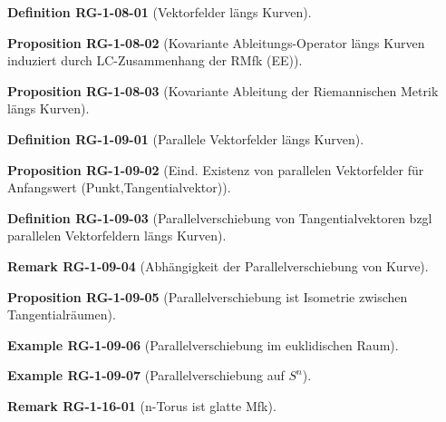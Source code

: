 \documentclass[10pt, letterpaper]{article}
\newcommand{\CustomHeading}[3]{%
  \par\medskip\noindent%
  \textbf{#1 #2} \textnormal{(#3)}.\enskip%
}
\newenvironment{DEF}[2]{\CustomHeading{Definition}{#1}{#2}}{}
\newenvironment{PROP}[2]{\CustomHeading{Proposition}{#1}{#2}}{}
\newenvironment{REM}[2]{\CustomHeading{Remark}{#1}{#2}}{}
\newenvironment{EXA}[2]{\CustomHeading{Example}{#1}{#2}}{}
\begin{document}
\begin{DEF}{RG-1-08-01}{Vektorfelder längs Kurven}
\end{DEF}

\begin{PROP}{RG-1-08-02}{Kovariante Ableitungs-Operator längs Kurven induziert durch LC-Zusammenhang der RMfk (EE)}
\end{PROP}

\begin{PROP}{RG-1-08-03}{Kovariante Ableitung der Riemannischen Metrik längs Kurven}
\end{PROP}

\begin{DEF}{RG-1-09-01}{Parallele Vektorfelder längs Kurven}
\end{DEF}

\begin{PROP}{RG-1-09-02}{Eind. Existenz von parallelen Vektorfelder für Anfangswert (Punkt,Tangentialvektor)}
\end{PROP}

\begin{DEF}{RG-1-09-03}{Parallelverschiebung von Tangentialvektoren bzgl parallelen Vektorfeldern längs Kurven}
\end{DEF}

\begin{REM}{RG-1-09-04}{Abhängigkeit der Parallelverschiebung von Kurve}
\end{REM}

\begin{PROP}{RG-1-09-05}{Parallelverschiebung ist Isometrie zwischen Tangentialräumen}
\end{PROP}

\begin{EXA}{RG-1-09-06}{Parallelverschiebung im euklidischen Raum}
\end{EXA}

\begin{EXA}{RG-1-09-07}{Parallelverschiebung auf $S^n$}
\end{EXA}

\begin{REM}{RG-1-16-01}{n-Torus ist glatte Mfk}
\end{REM}
\end{document}
